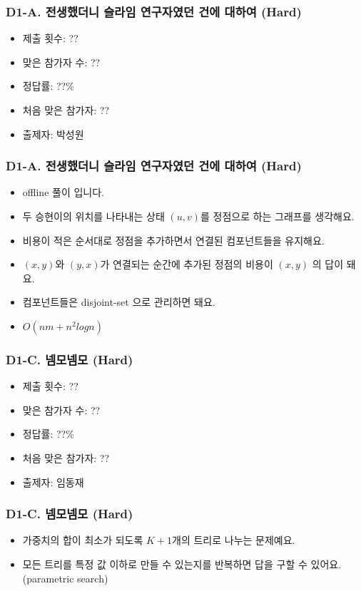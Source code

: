 \documentclass[xetex]{beamer}
\begin{document}
\begin{frame}
  \frametitle{D1-A. 전생했더니 슬라임 연구자였던 건에 대하여 (Hard)}
  \begin{itemize}
    \item 제출 횟수: ??
    \item 맞은 참가자 수: ??
    \item 정답률: ??\%
    \item 처음 맞은 참가자: ??
    \item 출제자: 박성원
  \end{itemize}
\end{frame}

\begin{frame}
  \frametitle{D1-A. 전생했더니 슬라임 연구자였던 건에 대하여 (Hard)}
  \begin{itemize}
    \item offline 풀이 입니다.
    \item 두 승현이의 위치를 나타내는 상태 $(u, v)$를 정점으로 하는 그래프를 생각해요.
    \item 비용이 적은 순서대로 정점을 추가하면서 연결된 컴포넌트들을 유지해요.
    \item $(x, y)$와 $(y, x)$가 연결되는 순간에 추가된 정점의 비용이 $(x, y)$ 의 답이 돼요.
    \item 컴포넌트들은 disjoint-set 으로 관리하면 돼요.
    \item $O(n m + n^{2} log{n})$
  \end{itemize}
\end{frame}

\begin{frame}
  \frametitle{D1-C. 넴모넴모 (Hard)}
  \begin{itemize}
    \item 제출 횟수: ??
    \item 맞은 참가자 수: ??
    \item 정답률: ??\%
    \item 처음 맞은 참가자: ??
    \item 출제자: 임동재
  \end{itemize}
\end{frame}

\begin{frame}
  \frametitle{D1-C. 넴모넴모 (Hard)}
  \begin{itemize}
    \item 가중치의 합이 최소가 되도록 $K+1$개의 트리로 나누는 문제예요.
    \item 모든 트리를 특정 값 이하로 만들 수 있는지를 반복하면 답을 구할 수 있어요. (parametric search)
  \end{itemize}
\end{frame}
\end{document}
